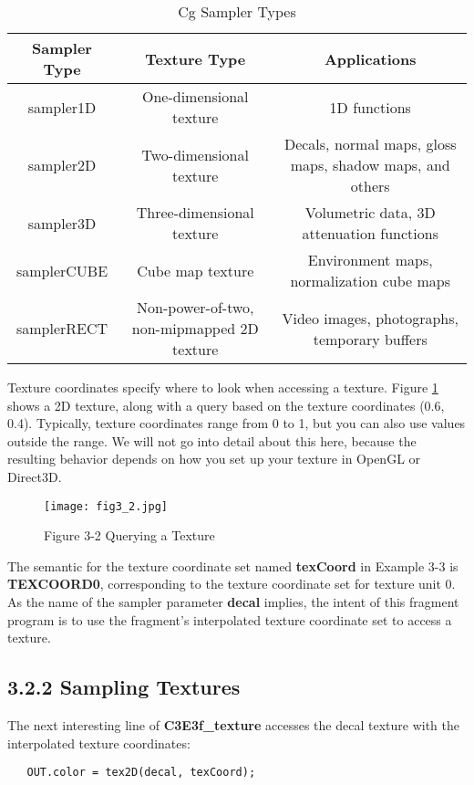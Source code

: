 \documentclass[../main.tex]{subfiles}
\begin{document}
\begin{table}
\centering
\begin{tabular}{ |c|c|c| } 
 \hline
Sampler Type & Texture Type & Applications \\
\hline
sampler1D & One-dimensional texture & 1D functions \\
sampler2D & Two-dimensional texture & Decals, normal maps, gloss maps, shadow maps, and others \\
sampler3D & Three-dimensional texture & Volumetric data, 3D attenuation functions \\
samplerCUBE & Cube map texture & Environment maps, normalization cube maps \\
samplerRECT & Non-power-of-two, non-mipmapped 2D texture & Video images, photographs, temporary buffers \\
 \hline
\end{tabular}
\caption{Cg Sampler Types}
\label{table:3-1}
\end{table}

Texture coordinates specify where to look when accessing a texture. Figure \ref{fig:3-2} shows a 2D texture, along with a query based on the texture coordinates (0.6, 0.4). Typically, texture coordinates range from 0 to 1, but you can also use values outside the range. We will not go into detail about this here, because the resulting behavior depends on how you set up your texture in OpenGL or Direct3D.

\begin{figure}
    \centering
    \texttt{[image: fig3\_2.jpg]}
    \caption{Figure 3-2 Querying a Texture}
    \label{fig:3-2}
\end{figure}

The semantic for the texture coordinate set named \textbf{texCoord} in Example 3-3 is \textbf{TEXCOORD0}, corresponding to the texture coordinate set for texture unit 0. As the name of the sampler parameter \textbf{decal} implies, the intent of this fragment program is to use the fragment's interpolated texture coordinate set to access a texture.

\subsection{3.2.2 Sampling Textures}

The next interesting line of \textbf{C3E3f_texture} accesses the decal texture with the interpolated texture coordinates:

\FloatBarrier
\begin{lstlisting}
   OUT.color = tex2D(decal, texCoord);
\end{lstlisting}
\FloatBarrier
\end{document}
